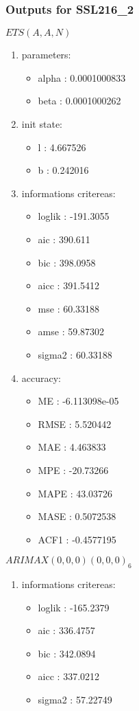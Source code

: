 \documentclass[10pt,a4paper]{article}\usepackage[]{graphicx}\usepackage[]{color}
\newcommand{\AaA}{\_}
\begin{document}
\subsubsection{Outputs for SSL216\AaA 2}
\begin{multicols}{2}


$ ETS(A,A,N) $
\begin{enumerate}
\item parameters:
\begin{itemize}
\item  alpha :  0.0001000833 
\item  beta :  0.0001000262 
\end{itemize}
\item init state:
\begin{itemize}
\item  l :  4.667526 
\item  b :  0.242016 
\end{itemize}
\item informations critereas:
\begin{itemize}
\item  loglik :  -191.3055 
\item  aic :  390.611 
\item  bic :  398.0958 
\item  aicc :  391.5412 
\item  mse :  60.33188 
\item  amse :  59.87302 
\item  sigma2 :  60.33188 
\end{itemize}
\item accuracy:
\begin{itemize}
\item  ME :  -6.113098e-05 
\item  RMSE :  5.520442 
\item  MAE :  4.463833 
\item  MPE :  -20.73266 
\item  MAPE :  43.03726 
\item  MASE :  0.5072538 
\item  ACF1 :  -0.4577195 
\end{itemize}
\end{enumerate}

\columnbreak


 $ARIMAX(0,0,0)(0,0,0)_{6}$ 
\begin{enumerate}
\item informations critereas:
\begin{itemize}
\item  loglik :  -165.2379 
\item  aic :  336.4757 
\item  bic :  342.0894 
\item  aicc :  337.0212 
\item  sigma2 :  57.22749 
\end{itemize}


\end{enumerate}
\end{multicols}
\end{document}

